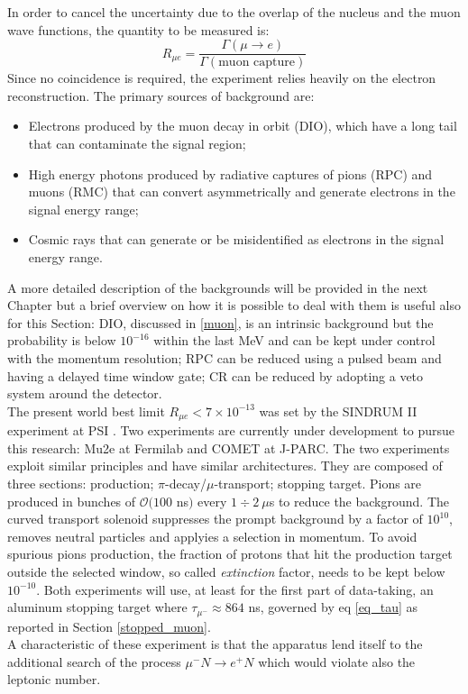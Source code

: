 \documentclass[12pt,a4paper,openright, oneside, titlepage]{book} %
\begin{document}
\noindent
In order to cancel the uncertainty due to the overlap of the nucleus and the muon wave functions, 
the quantity to be measured is: 
$$R_{\mu e} = \frac{\Gamma(\mu\rightarrow e)}{\Gamma(\textrm{muon capture})}$$
Since no coincidence is required, the experiment relies heavily on the electron reconstruction. 
The primary sources of background are:
\begin{itemize}
\item Electrons produced by the muon decay in orbit (DIO), which have a long tail that can contaminate the signal region;
\item High energy photons produced by radiative captures of pions (RPC) and muons (RMC) that can convert asymmetrically
and generate electrons in the signal energy range;
\item Cosmic rays that can generate or be misidentified as electrons in the signal energy range.
\end{itemize}
A more detailed description of the backgrounds will be provided in the next Chapter 
but a brief overview on how it is possible to deal with them is useful also for this Section: 
DIO, discussed in \ref{muon}, is an intrinsic background 
but the probability is below $10^{-16}$ within the last MeV 
and can be kept under control with the momentum resolution; 
RPC can be reduced using a pulsed beam and having a delayed time window gate; 
CR can be reduced by adopting a veto system around the detector.\\
The present world best limit  $R_{\mu e}<7\times10^{-13}$ 
was set by the SINDRUM II experiment at PSI \cite{SINDRUMII}.
Two experiments are currently under development to pursue this research: 
Mu2e \cite{MTDR} at Fermilab and COMET \cite{COMET_I} at J-PARC. 
The two experiments exploit similar principles and have similar architectures.
They are composed of three sections: production; $\pi$-decay/$\mu$-transport; stopping target. 
Pions are produced in bunches of $\mathcal{O}(100$ ns$)$ every $1\div 2\ \mu$s to reduce the background. 
The curved transport solenoid suppresses the prompt background by a factor of $10^{10}$,
removes neutral particles and applyies a selection in momentum. 
To avoid spurious pions production, the fraction of protons that hit the production target outside the selected window, so called \textit{extinction} factor, needs to be kept below $10^{-10}$. 
Both experiments will use, at least for the first part of
data-taking, an aluminum stopping target where $\tau_{\mu^-}\approx 864$ ns, governed by eq \ref{eq_tau} 
as reported in Section \ref{stopped_muon}. \\
A characteristic of these experiment is that the apparatus lend itself to the additional search of the process $\mu^- N \rightarrow e^+ N$ which would violate also the leptonic number.
\end{document}
